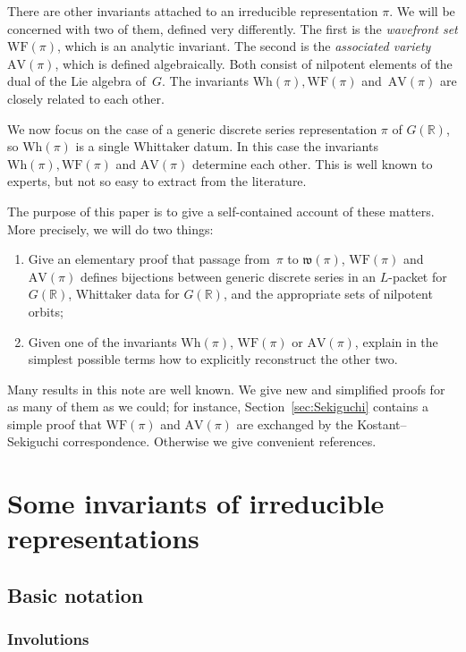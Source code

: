 \documentclass[10pt,leqno]{article}
\numberwithin{equation}{section}
\newcommand{\R}{\mathbb R}
\newcommand{\AV}{\mathrm{AV}}
\newcommand{\Wh}{\mathrm{Wh}}
\newcommand{\WF}{\mathrm{WF}}
\begin{document}
There are other invariants attached to an
irreducible representation $\pi$.  We will be concerned with two of
them, defined very differently. The first is the \emph{wavefront set} $\WF(\pi)$,
which is an analytic invariant.
The second is the \emph{associated variety} $\AV(\pi)$, which is
defined  algebraically.
Both consist of nilpotent elements of the dual of the Lie algebra of~$G$.
The invariants $\Wh(\pi), \WF(\pi)$ and~$\AV(\pi)$ are closely related to each other.

We now focus on the case of a generic discrete series representation
$\pi$ of $G(\R)$, so $\Wh(\pi)$ is a single Whittaker datum.  In this
case the invariants $\Wh(\pi), \WF(\pi)$ and $\AV(\pi)$ determine each
other. This is well known to experts, but not so easy to extract
from the literature. 

The purpose
of this paper is to give a self-contained account of these matters. More precisely, we will do two things:
\begin{enumerate}
\item Give an elementary proof that  passage from~$\pi$ to $\mathfrak{w}(\pi)$, $\WF(\pi)$ and $\AV(\pi)$ defines bijections between generic discrete series in an $L$-packet for $G(\R)$, Whittaker data for $G(\R)$, and the appropriate sets of nilpotent orbits;
\item Given one of the invariants $\Wh(\pi)$, $\WF(\pi)$ or $\AV(\pi)$, explain in the simplest possible terms how to explicitly reconstruct the other two.
\end{enumerate}
Many results in this note are well known. We give new and simplified proofs for as many of them as we could; for instance, Section~\ref{sec:Sekiguchi} contains a simple proof that $\WF(\pi)$ and $\AV(\pi)$ are exchanged by the Kostant--Sekiguchi correspondence. Otherwise we give convenient references.

\section{Some invariants of irreducible representations}

\subsection{Basic notation}

\subsubsection*{Involutions} 
\end{document}
